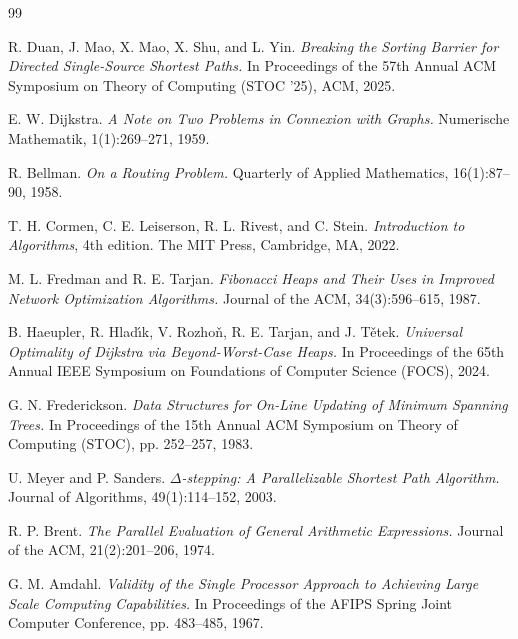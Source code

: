 \newpage
{}
\begin{thebibliography}{99}

R. Duan, J. Mao, X. Mao, X. Shu, and L. Yin.
\textit{Breaking the Sorting Barrier for Directed Single-Source Shortest Paths.}
In Proceedings of the 57th Annual ACM Symposium on Theory of Computing (STOC '25), ACM, 2025.

E. W. Dijkstra.
\textit{A Note on Two Problems in Connexion with Graphs.}
Numerische Mathematik, 1(1):269--271, 1959.

R. Bellman.
\textit{On a Routing Problem.}
Quarterly of Applied Mathematics, 16(1):87--90, 1958.

T. H. Cormen, C. E. Leiserson, R. L. Rivest, and C. Stein.
\textit{Introduction to Algorithms}, 4th edition.
The MIT Press, Cambridge, MA, 2022.

M. L. Fredman and R. E. Tarjan.
\textit{Fibonacci Heaps and Their Uses in Improved Network Optimization Algorithms.}
Journal of the ACM, 34(3):596--615, 1987.

B. Haeupler, R. Hlad{\'\i}k, V. Rozho{\v{n}}, R. E. Tarjan, and J. T{\v{e}}tek.
\textit{Universal Optimality of Dijkstra via Beyond-Worst-Case Heaps.}
In Proceedings of the 65th Annual IEEE Symposium on Foundations of Computer Science (FOCS), 2024.

G. N. Frederickson.
\textit{Data Structures for On-Line Updating of Minimum Spanning Trees.}
In Proceedings of the 15th Annual ACM Symposium on Theory of Computing (STOC), pp. 252--257, 1983.

U. Meyer and P. Sanders.
\textit{$\Delta$-stepping: A Parallelizable Shortest Path Algorithm.}
Journal of Algorithms, 49(1):114--152, 2003.

R. P. Brent.
\textit{The Parallel Evaluation of General Arithmetic Expressions.}
Journal of the ACM, 21(2):201--206, 1974.

G. M. Amdahl.
\textit{Validity of the Single Processor Approach to Achieving Large Scale Computing Capabilities.}
In Proceedings of the AFIPS Spring Joint Computer Conference, pp. 483--485, 1967.


\end{thebibliography}
